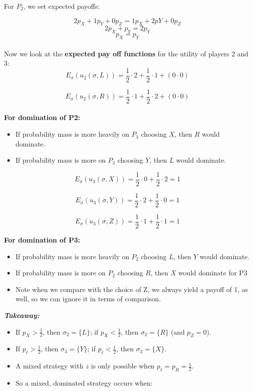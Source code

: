 \documentclass{article}
\begin{document}
For \( P_2 \), we set expected payoffs:

\[
2p_X + 1p_Y + 0p_Z = 1p_X + 2pY + 0p_Z
\]
\[
2p_X + p_Y = 2p_Y
\]
\[
p_X = p_Y
\]
\\
Now we look at the \textbf{expected pay off functions} for the utility of players 2 and 3: 
\\

\[
E_{\sigma}(u_2(\sigma,L)) = \frac{1}{2} \cdot 2 + \frac{1}{2} \cdot 1 + (0 \cdot 0)
\]

\[
E_{\sigma}(u_2(\sigma,R)) = \frac{1}{2} \cdot 1 + \frac{1}{2} \cdot 2 + (0 \cdot 0)
\]
\\ 
\textbf{For domination of P2:}
\begin{itemize}
    \item If probability mass is more heavily on \( P_3 \) choosing \( X \), then \( R \) would dominate.
    \item If probability mass is more on \( P_3 \) choosing \( Y \), then \( L \) would dominate.
\end{itemize}


\[
E_{\sigma}(u_3(\sigma,X)) = \frac{1}{2} \cdot 0 + \frac{1}{2} \cdot 2 = 1 
\]

\[
E_{\sigma}(u_3(\sigma,Y)) = \frac{1}{2} \cdot 2 + \frac{1}{2} \cdot 0 = 1
\]

\[
E_{\sigma}(u_3(\sigma,Z)) = \frac{1}{2} \cdot 1 + \frac{1}{2} \cdot 1 = 1
\]

\vspace{2mm}
\textbf{For domination of P3:}
\begin{itemize}
    \item If probability mass is more heavily on \( P_2 \) choosing \( L \), then \( Y \) would dominate.
    \item If probability mass is more on \( P_2 \) choosing \( R \), then \( X \) would dominate for P3
    \item Note when we compare with the choice of Z, we always yield a payoff of 1, as well, so we can ignore it in terms of comparison. 
\end{itemize}
\vspace{2mm}

\textit{\textbf{Takeaway:}}
\begin{itemize}
    \item If \( p_X > \frac{1}{2} \), then \( \sigma_2 = \{L\} \); if \( p_X < \frac{1}{2} \), then \( \sigma_2 = \{R\} \) (and \( p_Z = 0 \)).
    \item If \( p_\ell > \frac{1}{2} \), then \( \sigma_3 = \{Y\} \); if \( p_\ell < \frac{1}{2} \), then \( \sigma_3 = \{X\} \).
    \item A mixed strategy with \( z \) is only possible when \( p_\ell = p_R = \frac{1}{2} \).
    \item So a mixed, dominated strategy occurs when:
\end{itemize}
\end{document}

